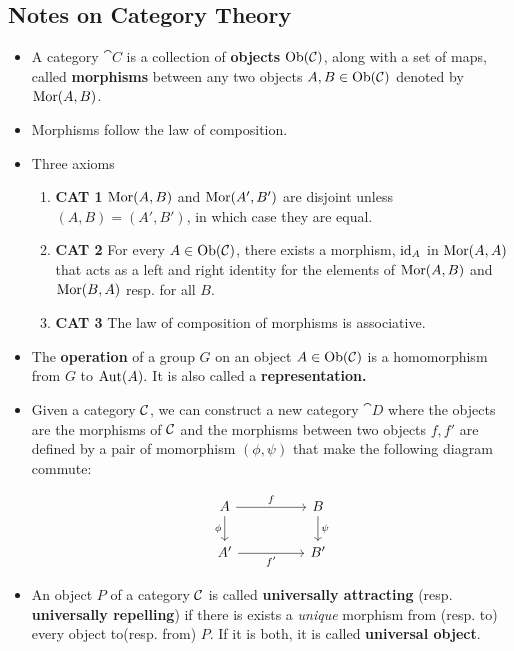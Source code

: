     \subsection*{Notes on Category Theory}
    \begin{itemize}
        \item A category $\cat{C}$ is a collection of \textbf{objects} $\text{Ob}(\mathcal{C})$, along with a set of maps, called \textbf{morphisms} between any two objects $A,B \in \text{Ob}(\mathcal{C})$ denoted by $\text{Mor}(A, B)$.
        \item Morphisms follow the law of composition.
        \item Three axioms
        \begin{enumerate}
            \item \textbf{CAT 1} $\text{Mor}(A, B)$ and $\text{Mor}(A', B')$ are disjoint unless $(A, B) = (A', B')$, in which case they are equal.
            \item \textbf{CAT 2} For every $A \in \text{Ob}(\mathcal{C})$, there exists a morphism, $\text{id}_A$ in $\text{Mor}(A, A)$ that acts as a left and right identity for the elements of $\text{Mor}(A, B)$ and $\text{Mor}(B, A)$ resp. for all $B$.
            \item \textbf{CAT 3} The law of composition of morphisms is associative.
        \end{enumerate}
        \item The \textbf{operation} of a group $G$ on an object $A \in \text{Ob}(\mathcal{C})$ is a homomorphism from $G$ to $\text{Aut}(A).$ It is also called a \textbf{representation.}
        \item Given a category $\mathcal{C}$, we can construct a new category $\cat{D}$ where the objects are the morphisms of $\mathcal{C}$ and the morphisms between two objects $f, f'$ are  defined by a pair of momorphism $(\phi, \psi)$  that make the following diagram commute:
 
\[\begin{tikzcd}
	A && B \\
	{A'} && {B'}
	\arrow["f", from=1-1, to=1-3]
	\arrow["\phi"', from=1-1, to=2-1]
	\arrow["\psi", from=1-3, to=2-3]
	\arrow["{f'}"', from=2-1, to=2-3]
\end{tikzcd}\]

\label{universal_object}\item An object $P$ of a category $\mathcal{C}$ is called \textbf{universally attracting} (resp. \textbf{universally repelling}) if there is exists a \textit{unique} morphism from (resp. to) every object to(resp. from) $P$. If it is both, it is called \textbf{universal object}.

\end{itemize}    